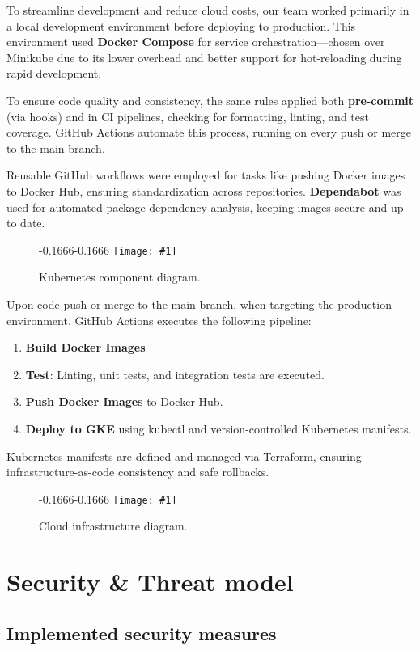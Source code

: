 \documentclass[11pt,a4paper]{article}
\newcommand{\fullpageimage}[1]{%
  \begin{adjustwidth*}{-0.1666\paperwidth}{-0.1666\paperwidth}
    \noindent\texttt{[image: \#1]}
  \end{adjustwidth*}
}
\begin{document}
To streamline development and reduce cloud costs, our team worked primarily in a local development environment before deploying to production. This environment used \textbf{Docker Compose} for service orchestration—chosen over Minikube due to its lower overhead and better support for hot-reloading during rapid development.

To ensure code quality and consistency, the same rules applied both \textbf{pre-commit} (via hooks) and in CI pipelines, checking for formatting, linting, and test coverage. GitHub Actions automate this process, running on every push or merge to the main branch.

Reusable GitHub workflows were employed for tasks like pushing Docker images to Docker Hub, ensuring standardization across repositories. \textbf{Dependabot} was used for automated package dependency analysis, keeping images secure and up to date.

\begin{figure}
  \centering
  \fullpageimage{kubectl.png}
  \caption{Kubernetes component diagram.}
  \label{fig:kubectl}
\end{figure}
Upon code push or merge to the main branch, when targeting the production environment, GitHub Actions executes
the following pipeline:
\begin{enumerate}
  \item \textbf{Build Docker Images}
  \item \textbf{Test}: Linting, unit tests, and integration tests are executed.
  \item \textbf{Push Docker Images} to Docker Hub.
  \item \textbf{Deploy to GKE} using kubectl and version-controlled
    Kubernetes manifests.
\end{enumerate}

Kubernetes manifests are defined and managed via Terraform, ensuring
infrastructure-as-code consistency and safe rollbacks.

\begin{figure}[H]
  \centering
  \fullpageimage{terraform.png}
  \caption{Cloud infrastructure diagram.}
  \label{fig:terraform}
\end{figure}

\section{Security \& Threat model}

\subsection{Implemented security measures}
\label{sub:security}
\end{document}
